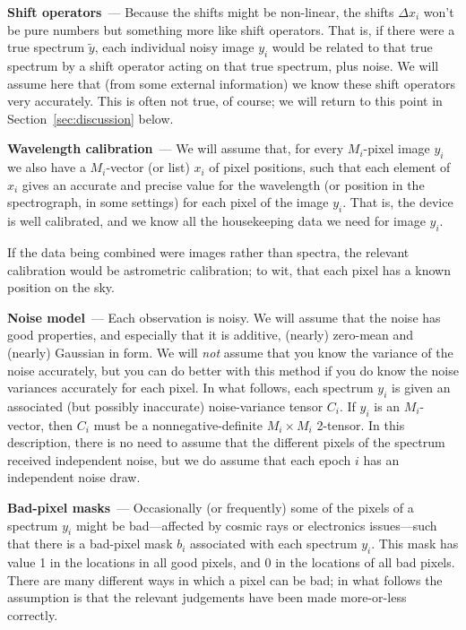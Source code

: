\documentclass[modern, linenumbers]{aastex631}
\renewcommand{\paragraph}[1]{\medskip\par\noindent\textbf{#1}~---}
\newcommand{\sectionname}{Section}
\newcommand{\secref}[1]{\sectionname~\ref{#1}}
\begin{document}
\paragraph{Shift operators}
Because the shifts might be non-linear, the shifts $\Delta x_i$ won't be pure numbers but something more like shift operators.
That is, if there were a true spectrum $\tilde{y}$, each individual noisy image $y_i$ would be related to that true spectrum by a shift operator acting on that true spectrum, plus noise.
We will assume here that (from some external information) we know these shift operators very accurately.
This is often not true, of course; we will return to this point in \secref{sec:discussion} below.

\paragraph{Wavelength calibration}
We will assume that, for every $M_i$-pixel image $y_i$ we also have a $M_i$-vector (or list) $x_i$ of pixel positions, such that each element of $x_i$ gives an accurate and precise value for the wavelength (or position in the spectrograph, in some settings) for each pixel of the image $y_i$.
That is, the device is well calibrated, and we know all the housekeeping data we need for image $y_i$.

If the data being combined were images rather than spectra, the relevant calibration would be astrometric calibration; to wit, that each pixel has a known position on the sky.

\paragraph{Noise model}
Each observation is noisy.
We will assume that the noise has good properties, and especially that it is additive, (nearly) zero-mean and (nearly) Gaussian in form.
We will \emph{not} assume that you know the variance of the noise accurately, but you can do better with this method if you do know the noise variances accurately for each pixel.
In what follows, each spectrum $y_i$ is given an associated (but possibly inaccurate) noise-variance tensor $C_i$.
If $y_i$ is an $M_i$-vector, then $C_i$ must be a nonnegative-definite $M_i\times M_i$ 2-tensor.
In this description, there is no need to assume that the different pixels of the spectrum received independent noise, but we do assume that each epoch $i$ has an independent noise draw.

\paragraph{Bad-pixel masks}
Occasionally (or frequently) some of the pixels of a spectrum $y_i$ might be bad---affected by cosmic rays or electronics issues---such that there is a bad-pixel mask $b_i$ associated with each spectrum $y_i$.
This mask has value 1 in the locations in all good pixels, and 0 in the locations of all bad pixels.
There are many different ways in which a pixel can be bad; in what follows the assumption is that the relevant judgements have been made more-or-less correctly.
\end{document}
